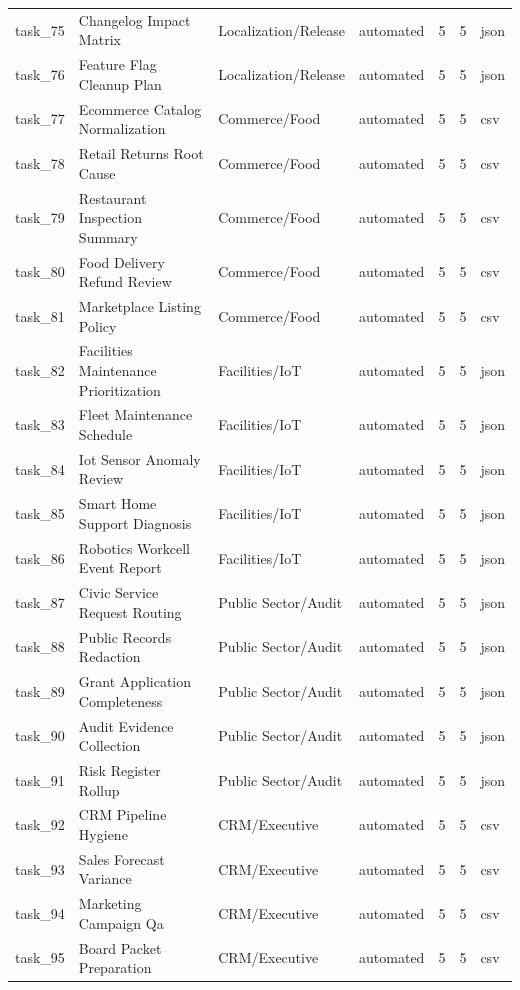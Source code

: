 \documentclass[11pt]{article}
\begin{document}
\begin{longtable}{L{0.09\textwidth}L{0.30\textwidth}L{0.25\textwidth}L{0.10\textwidth}L{0.07\textwidth}L{0.07\textwidth}L{0.08\textwidth}}
task\_75 & Changelog Impact Matrix & Localization/Release & automated & 5 & 5 & json \\
task\_76 & Feature Flag Cleanup Plan & Localization/Release & automated & 5 & 5 & json \\
task\_77 & Ecommerce Catalog Normalization & Commerce/Food & automated & 5 & 5 & csv \\
task\_78 & Retail Returns Root Cause & Commerce/Food & automated & 5 & 5 & csv \\
task\_79 & Restaurant Inspection Summary & Commerce/Food & automated & 5 & 5 & csv \\
task\_80 & Food Delivery Refund Review & Commerce/Food & automated & 5 & 5 & csv \\
task\_81 & Marketplace Listing Policy & Commerce/Food & automated & 5 & 5 & csv \\
task\_82 & Facilities Maintenance Prioritization & Facilities/IoT & automated & 5 & 5 & json \\
task\_83 & Fleet Maintenance Schedule & Facilities/IoT & automated & 5 & 5 & json \\
task\_84 & Iot Sensor Anomaly Review & Facilities/IoT & automated & 5 & 5 & json \\
task\_85 & Smart Home Support Diagnosis & Facilities/IoT & automated & 5 & 5 & json \\
task\_86 & Robotics Workcell Event Report & Facilities/IoT & automated & 5 & 5 & json \\
task\_87 & Civic Service Request Routing & Public Sector/Audit & automated & 5 & 5 & json \\
task\_88 & Public Records Redaction & Public Sector/Audit & automated & 5 & 5 & json \\
task\_89 & Grant Application Completeness & Public Sector/Audit & automated & 5 & 5 & json \\
task\_90 & Audit Evidence Collection & Public Sector/Audit & automated & 5 & 5 & json \\
task\_91 & Risk Register Rollup & Public Sector/Audit & automated & 5 & 5 & json \\
task\_92 & CRM Pipeline Hygiene & CRM/Executive & automated & 5 & 5 & csv \\
task\_93 & Sales Forecast Variance & CRM/Executive & automated & 5 & 5 & csv \\
task\_94 & Marketing Campaign Qa & CRM/Executive & automated & 5 & 5 & csv \\
task\_95 & Board Packet Preparation & CRM/Executive & automated & 5 & 5 & csv \\

\end{longtable}
\end{document}
